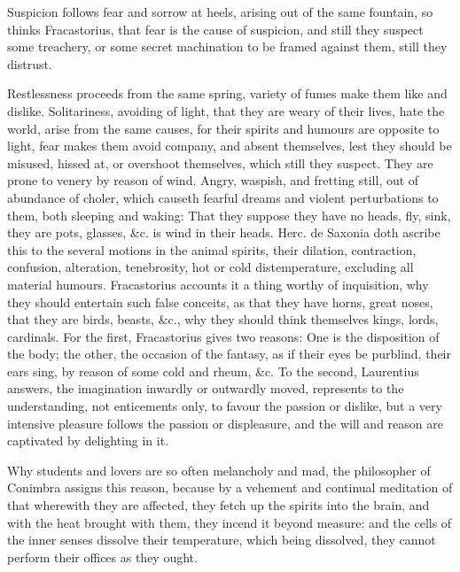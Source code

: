 {Suspicion follows fear and sorrow at heels, arising out of the same
fountain, so thinks Fracastorius, that fear is the cause of
suspicion, and still they suspect some treachery, or some secret
machination to be framed against them, still they distrust.

Restlessness proceeds from the same spring, variety of fumes make them
like and dislike. Solitariness, avoiding of light, that they are weary
of their lives, hate the world, arise from the same causes, for their
spirits and humours are opposite to light, fear makes them avoid
company, and absent themselves, lest they should be misused, hissed at,
or overshoot themselves, which still they suspect. They are prone to
venery by reason of wind. Angry, waspish, and fretting still, out of
abundance of choler, which causeth fearful dreams and violent
perturbations to them, both sleeping and waking: That they suppose they
have no heads, fly, sink, they are pots, glasses, \&c. is wind in their
heads. Herc. de Saxonia doth ascribe this to the several motions
in the animal spirits, their dilation, contraction, confusion,
alteration, tenebrosity, hot or cold distemperature, excluding all
material humours. Fracastorius accounts it a thing worthy of
inquisition, why they should entertain such false conceits, as that
they have horns, great noses, that they are birds, beasts, \&c., why
they should think themselves kings, lords, cardinals. For the first,
 Fracastorius gives two reasons: One is the disposition of the
body; the other, the occasion of the fantasy, as if their eyes be
purblind, their ears sing, by reason of some cold and rheum, \&c. To the
second, Laurentius answers, the imagination inwardly or outwardly
moved, represents to the understanding, not enticements only, to favour
the passion or dislike, but a very intensive pleasure follows the
passion or displeasure, and the will and reason are captivated by
delighting in it.

Why students and lovers are so often melancholy and mad, the
philosopher of Conimbra assigns this reason, because by a
vehement and continual meditation of that wherewith they are affected,
they fetch up the spirits into the brain, and with the heat brought
with them, they incend it beyond measure: and the cells of the inner
senses dissolve their temperature, which being dissolved, they cannot
perform their offices as they ought.

}
